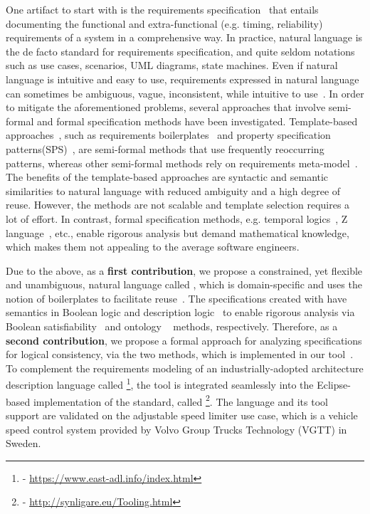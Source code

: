 One artifact to start with is the requirements specification~\cite{ieereqspecstandard} that entails documenting the functional and extra-functional (e.g. timing, reliability) requirements of a system in a comprehensive way. In practice, natural language
is the de facto standard for requirements specification, and quite seldom notations such as use cases, scenarios, UML diagrams, state machines. Even if natural language is intuitive and easy to use, requirements expressed in natural language can sometimes be ambiguous, vague, inconsistent, while intuitive to use~\cite{ieereqspecstandard}. In order to mitigate the aforementioned problems, several approaches that involve semi-formal and formal specification methods have been investigated. Template-based approaches~\cite{Farfeleder2011DODT:Development}, such as requirements boilerplates~\cite{Hull2011RequirementsEngineering}\cite{Farfeleder2011DODT:Development} and property specification patterns(SPS)~\cite{Gruhn2006PatternsSpecifications}\cite{Konrad2005Real-timePatterns}, are semi-formal methods that use frequently reoccurring patterns, whereas other semi-formal methods rely on requirements meta-model~\cite{Yskout2008TransformingArchitecture}\cite{Bachmann2010ADevelopment}\cite{attempto96}\cite{Schwitter2002EnglishLanguage}. The benefits of the template-based approaches are syntactic and semantic similarities to natural language with reduced ambiguity and a high degree of reuse. However, the methods are not scalable and template selection requires a lot of effort. In contrast, formal specification methods, e.g. temporal logics~\cite{sep-logic-temporal}, Z language~\cite{ORegan2017ZLanguage}, etc., enable rigorous analysis but demand mathematical knowledge, which makes them not appealing to the average software engineers.
 
Due to the above, as a \textbf{first contribution}, we propose a constrained, yet flexible and unambiguous, natural language called \resa, which is domain-specific and uses the notion of boilerplates to facilitate reuse~\cite{Mahmud2015ReSA:Systems}. The specifications created with \resa{} have semantics in Boolean logic and description logic~\cite{Mann2014TheApplications} to enable rigorous analysis via Boolean satisfiability~\cite{Malik2009BooleanSuccess} and ontology ~\cite{f25ea3c6f4b743cd90c150926bbcf3db} methods, respectively. Therefore, as a \textbf{second contribution}, we propose a formal approach for analyzing \resa{} specifications for logical consistency, via the two methods, which is implemented in our \resa{} tool~\cite{resatool}. To complement the requirements modeling of an industrially-adopted architecture description language called \eastadl\footnote{\eastadl{} - \url{https://www.east-adl.info/index.html}}\cite{Blom2016EAST-ADL:Research}, the \resa{} tool is integrated seamlessly into the Eclipse-based implementation of the \eastadl{} standard, called \eatop\footnote{\eatop{} - \url{http://synligare.eu/Tooling.html}}. The language and its tool support are validated on the adjustable speed limiter use case, which is a vehicle speed control system provided by Volvo Group Trucks Technology (VGTT) in Sweden.
 
